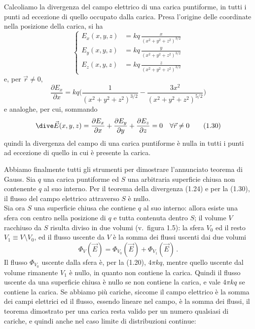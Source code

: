 Calcoliamo la divergenza del campo elettrico di una carica puntiforme, in tutti
i punti ad eccezione di quello occupato dalla carica. Presa l'origine delle
coordinate nella posizione della carica, si ha
\begin{equation}
  \left\{\begin{aligned}
    E_x(x,y,z)&=kq\,\frac{x}{(x^2+y^2+z^2)^{3/2}}\\
    E_y(x,y,z)&=kq\,\frac{y}{(x^2+y^2+z^2)^{3/2}}\\
    E_z(x,y,z)&=kq\,\frac{z}{(x^2+y^2+z^2)^{3/2}}
  \end{aligned}\right.
  \tag{1.28}
\end{equation}
e, per $\vec r\neq0$,
\begin{equation}
  \frac{\partial E_x}{\partial x}=kq\Big(\frac{1}{(x^2+y^2+z^2)^{3/2}}
  -\frac{3x^2}{(x^2+y^2+z^2)^{5/2}}\Big)
  \tag{1.29}
\end{equation}
e analoghe, per cui, sommando
\begin{equation}
  \dive\vec E(x,y,z)=\frac{\partial E_x}{\partial x}
  +\frac{\partial E_y}{\partial y}+\frac{\partial E_z}{\partial z}=0
  \quad\forall\vec r\neq0
  \tag{1.30}
\end{equation}
quindi la divergenza del campo di una carica puntiforme \`e nulla in tutti i
punti ad eccezione di quello in cui \`e presente la carica.

Abbiamo finalmente tutti gli strumenti per dimostrare l'annunciato teorema di
Gauss. Sia $q$ una carica puntiforme ed $S$ una arbitraria superficie chiusa non
contenente $q$ al suo interno. Per il teorema della divergenza (1.24) e per la
(1.30), il flusso del campo elettrico attraverso $S$ \`e nullo.\\
Sia ora $S$ una superficie chiusa che contiene $q$ al suo interno: allora esiste
una sfera con centro nella posizione di $q$ e tutta contenuta dentro $S$; il
volume $V$ racchiuso da $S$ risulta diviso in due volumi (v.\ figura 1.5): la
sfera $V_0$ ed il resto $V_1\equiv V\setminus V_0$, ed il flusso uscente da $V$
\`e la somma dei flussi uscenti dai due volumi
\begin{equation}
  \Phi_V(\vec E)=\Phi_{V_0}(\vec E)+\Phi_{V_1}(\vec E)\,.
  \tag{1.31}
\end{equation}
Il flusso $\Phi_{V_0}$ uscente dalla sfera \`e, per la (1.20), $4\pi kq$, mentre
quello uscente dal volume rimanente $V_1$ \`e nullo, in quanto non contiene la
carica. Quindi il flusso uscente da una superficie chiusa \`e nullo se non
contiene la carica, e vale $4\pi kq$ se contiene la carica. Se abbiamo pi\`u
cariche, siccome il campo elettrico \`e la somma dei campi elettrici ed il
flusso, essendo lineare nel campo, \`e la somma dei flussi, il teorema
dimostrato per una carica resta valido per un numero qualsiasi di cariche, e
quindi anche nel caso limite di distribuzioni continue:

